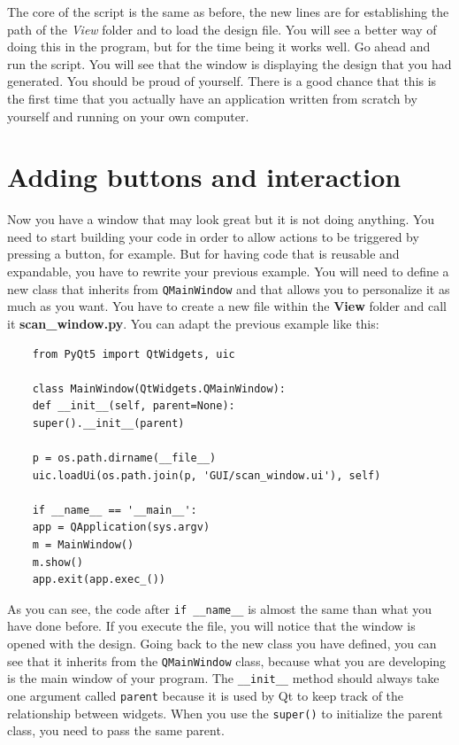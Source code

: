 The core of the script is the same as before, the new lines are for
establishing the path of the \emph{View} folder and to load the design
file. You will see a better way of doing this in the program, but for
the time being it works well. Go ahead and run the script. You will see
that the window is displaying the design that you had generated. You
should be proud of yourself. There is a good chance that this is the
first time that you actually have an application written from scratch by
yourself and running on your own computer.


\section{Adding buttons and interaction}\label{adding-buttons-andinteraction}
Now you have a window that may look great but it is not doing anything.
You need to start building your code in order to allow actions to be
triggered by pressing a button, for example. But for having code that
is reusable and expandable, you have to rewrite your previous example.
You will need to define a new class that inherits from
\texttt{QMainWindow} and that allows you to personalize it as much as
you want. You have to create a new file within the \textbf{View} folder
and call it \textbf{scan\_window.py}. You can adapt the previous example
like this:

\begin{verbatim}
    from PyQt5 import QtWidgets, uic

    class MainWindow(QtWidgets.QMainWindow):
    def __init__(self, parent=None):
    super().__init__(parent)

    p = os.path.dirname(__file__)
    uic.loadUi(os.path.join(p, 'GUI/scan_window.ui'), self)

    if __name__ == '__main__':
    app = QApplication(sys.argv)
    m = MainWindow()
    m.show()
    app.exit(app.exec_())
\end{verbatim}

As you can see, the code after \texttt{if __name__} is almost the
same than what you have done before. If you execute the file, you will
notice that the window is opened with the design. Going back to the new
class you have defined, you can see that it inherits from the
\texttt{QMainWindow} class, because what you are developing is the main
window of your program. The \texttt{__init__} method should always
take one argument called \texttt{parent} because it is used by Qt to
keep track of the relationship between widgets. When you use the
\texttt{super()} to initialize the parent class, you need to pass the
same parent.

